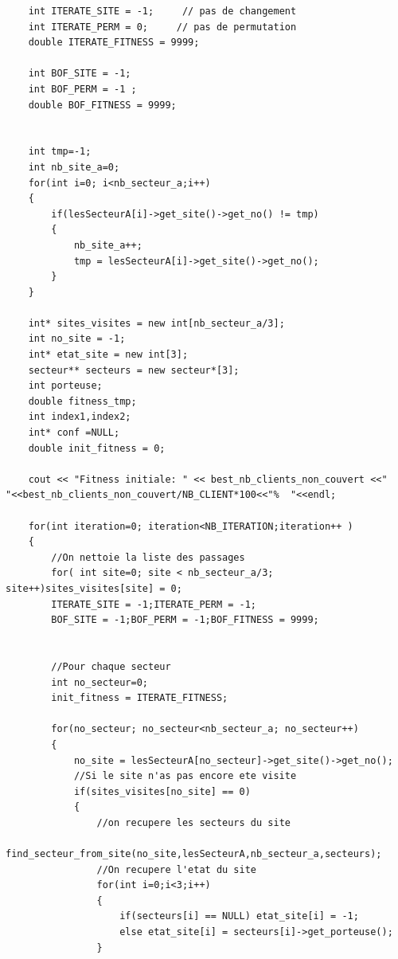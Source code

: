 \documentclass[a4paper, 11pt]{report}
\begin{document}
\begin{appendices}
\begin{lstlisting}
    int ITERATE_SITE = -1;     // pas de changement
    int ITERATE_PERM = 0;     // pas de permutation
    double ITERATE_FITNESS = 9999;

    int BOF_SITE = -1;
    int BOF_PERM = -1 ;
    double BOF_FITNESS = 9999;


    int tmp=-1;
    int nb_site_a=0;
    for(int i=0; i<nb_secteur_a;i++)
    {
        if(lesSecteurA[i]->get_site()->get_no() != tmp)
        {
            nb_site_a++;
            tmp = lesSecteurA[i]->get_site()->get_no();
        }
    }

    int* sites_visites = new int[nb_secteur_a/3];
    int no_site = -1;
    int* etat_site = new int[3];
    secteur** secteurs = new secteur*[3];
    int porteuse;
    double fitness_tmp;
    int index1,index2;
    int* conf =NULL;
    double init_fitness = 0;

    cout << "Fitness initiale: " << best_nb_clients_non_couvert <<"   "<<best_nb_clients_non_couvert/NB_CLIENT*100<<"%  "<<endl;

    for(int iteration=0; iteration<NB_ITERATION;iteration++ )
    {
        //On nettoie la liste des passages
        for( int site=0; site < nb_secteur_a/3; site++)sites_visites[site] = 0;
        ITERATE_SITE = -1;ITERATE_PERM = -1;
        BOF_SITE = -1;BOF_PERM = -1;BOF_FITNESS = 9999;


        //Pour chaque secteur
        int no_secteur=0;
        init_fitness = ITERATE_FITNESS;

        for(no_secteur; no_secteur<nb_secteur_a; no_secteur++)
        {
            no_site = lesSecteurA[no_secteur]->get_site()->get_no();
            //Si le site n'as pas encore ete visite
            if(sites_visites[no_site] == 0)
            {
                //on recupere les secteurs du site
                find_secteur_from_site(no_site,lesSecteurA,nb_secteur_a,secteurs);
                //On recupere l'etat du site
                for(int i=0;i<3;i++)
                {
                    if(secteurs[i] == NULL) etat_site[i] = -1;
                    else etat_site[i] = secteurs[i]->get_porteuse();
                }




\end{lstlisting}
\end{appendices}
\end{document}
